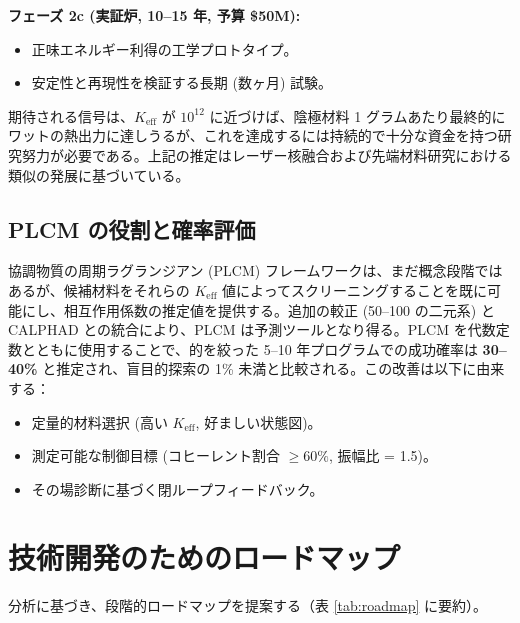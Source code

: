 \documentclass[12pt]{article}
\newcommand{\Keff}{K_{\mathrm{eff}}}
\theoremstyle{remark}
\begin{document}
	\textbf{フェーズ 2c (実証炉, 10–15 年, 予算 \$50M):}
	\begin{itemize}
		\item 正味エネルギー利得の工学プロトタイプ。
		\item 安定性と再現性を検証する長期 (数ヶ月) 試験。
	\end{itemize}
	
	期待される信号は、\(\Keff\) が \(10^{12}\) に近づけば、陰極材料 1 グラムあたり最終的にワットの熱出力に達しうるが、これを達成するには持続的で十分な資金を持つ研究努力が必要である。上記の推定はレーザー核融合および先端材料研究における類似の発展に基づいている。
	
	\subsection{PLCM の役割と確率評価}
	
	協調物質の周期ラグランジアン (PLCM) フレームワークは、まだ概念段階ではあるが、候補材料をそれらの \(K_{\mathrm{eff}}\) 値によってスクリーニングすることを既に可能にし、相互作用係数の推定値を提供する。追加の較正 (50–100 の二元系) と CALPHAD との統合により、PLCM は予測ツールとなり得る。PLCM を代数定数とともに使用することで、的を絞った 5–10 年プログラムでの成功確率は \textbf{30–40\%} と推定され、盲目的探索の 1\% 未満と比較される。この改善は以下に由来する：
	\begin{itemize}
		\item 定量的材料選択 (高い \(K_{\mathrm{eff}}\), 好ましい状態図)。
		\item 測定可能な制御目標 (コヒーレント割合 \(\geq 60\%\), 振幅比 = 1.5)。
		\item その場診断に基づく閉ループフィードバック。
	\end{itemize}
	
	\section{技術開発のためのロードマップ}
	\label{sec:roadmap}
	
	分析に基づき、段階的ロードマップを提案する（表 \ref{tab:roadmap} に要約）。
	
\end{document}
